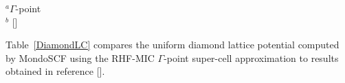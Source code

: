 \documentclass[prb,aps,nobibnotes,twocolumn,doublespace,twocolumngrid,superbib]{revtex4}
\begin{document}
\begin{table}[ht]
\caption{Lattice Constants in angstoms for the Diamond System for different 
system sizes, theory levels, and basis sets at a loose tolerance. For comparision, 
the  experimental value for diamond calculated at zero Kelvin is ${\rm a}_0 = 3.567$\AA, 
and the best {\it ab initio} using the Meta-GGAs functional is  ${\rm a}_0 = 3.583$\AA
\cite{VStaroverov04,YTouloukian77}.}
\label{DiamondLC}
\raggedright{
{\hskip 0.33in}$^a \Gamma$-point\\
{\hskip 0.33in}$^b$ []\\}
\end{table}

Table~\ref{DiamondLC}  compares the uniform diamond lattice potential computed 
by MondoSCF using the RHF-MIC $\Gamma$-point super-cell approximation to results obtained in 
reference [].



\end{document}

